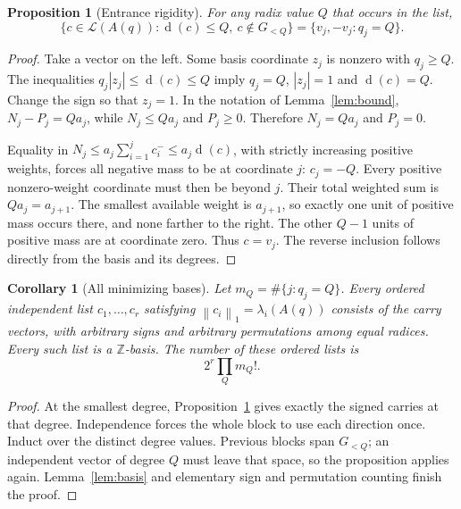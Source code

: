 \documentclass[11pt]{article}
\numberwithin{equation}{section}
\newtheorem{proposition}[theorem]{Proposition}
\newtheorem{corollary}[theorem]{Corollary}
\theoremstyle{definition}
\theoremstyle{remark}\newtheorem{remark}[theorem]{Remark}
\newcommand{\Z}{\mathbb Z}\newcommand{\N}{\mathbb N}
\newcommand{\Latt}{\mathcal L}
\newcommand{\dgr}{\operatorname{d}}
\newcommand{\norm}[1]{\left\lVert#1\right\rVert_1}
\begin{document}
\begin{proposition}[Entrance rigidity]\label{prop:rigidity}
For any radix value $Q$ that occurs in the list,
\begin{equation}\label{eq:rigidity}
 \{c\in\Latt(A(q)):\dgr(c)\le Q,\ c\notin G_{<Q}\}
      =\{v_j,-v_j:q_j=Q\}.
\end{equation}
\end{proposition}
\begin{proof}
Take a vector on the left.  Some basis coordinate $z_j$ is nonzero with
$q_j\ge Q$.  The inequalities
$q_j|z_j|\le\dgr(c)\le Q$ imply $q_j=Q$, $|z_j|=1$ and
$\dgr(c)=Q$.  Change the sign so that $z_j=1$.
In the notation of Lemma~\ref{lem:bound},
$N_j-P_j=Qa_j$, while $N_j\le Qa_j$ and $P_j\ge0$.
Therefore $N_j=Qa_j$ and $P_j=0$.

Equality in $N_j\le a_j\sum_{i=1}^j c_i^-\le a_j\dgr(c)$,
with strictly increasing positive weights, forces all negative mass to be
at coordinate $j$: $c_j=-Q$.  Every positive nonzero-weight coordinate must
then be beyond $j$.  Their total weighted sum is $Qa_j=a_{j+1}$.
The smallest available weight is $a_{j+1}$, so exactly one unit of positive
mass occurs there, and none farther to the right.  The other $Q-1$ units
of positive mass are at coordinate zero.  Thus $c=v_j$.
The reverse inclusion follows directly from the basis and its degrees.
\end{proof}

\begin{corollary}[All minimizing bases]\label{cor:bases}
Let $m_Q=\#\{j:q_j=Q\}$.  Every ordered independent list
$c_1,\ldots,c_r$ satisfying $\norm{c_i}=\lambda_i(A(q))$ consists of the
carry vectors, with arbitrary signs and arbitrary permutations among equal
radices.  Every such list is a $\Z$-basis.  The number of these ordered lists is
\begin{equation}\label{eq:basiscount}
 2^r\prod_Q m_Q!.
\end{equation}
\end{corollary}
\begin{proof}
At the smallest degree, Proposition~\ref{prop:rigidity} gives exactly the
signed carries at that degree.  Independence forces the whole block to use
each direction once.  Induct over the distinct degree values.  Previous
blocks span $G_{<Q}$; an independent vector of degree $Q$ must leave that
space, so the proposition applies again.  Lemma~\ref{lem:basis} and elementary
sign and permutation counting finish the proof.
\end{proof}
\end{document}
